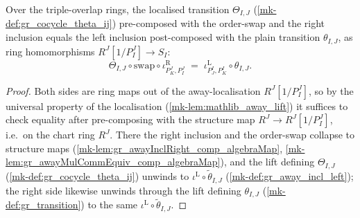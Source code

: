 \begin{lemma}\label{mk-lem:gr_chartTransition'_ringIdentity}
  \leanok

  Over the triple-overlap rings, the localised transition \(\Theta_{I,J}\)
  (\ref{mk-def:gr_cocycle_theta_ij}) pre-composed with the order-swap and the right
  inclusion equals the left inclusion post-composed with the plain transition
  \(\theta_{I,J}\), as ring homomorphisms \(R^J[1/P^J_I] \to S_I\):
  \[
    \Theta_{I,J} \circ \mathrm{swap} \circ \iota^{\mathrm{R}}_{P^J_K, P^J_I}
      \;=\; \iota^{\mathrm{L}}_{P^I_J, P^I_K} \circ \theta_{I,J} .
  \]
\end{lemma}
\begin{proof}
  \leanok
  Both sides are ring maps out of the away-localisation \(R^J[1/P^J_I]\), so by the
  universal property of the localisation (\ref{mk-lem:mathlib_away_lift}) it suffices
  to check equality after pre-composing with the structure map
  \(R^J \to R^J[1/P^J_I]\), i.e.\ on the chart ring \(R^J\). There the right
  inclusion and the order-swap collapse to structure maps
  (\ref{mk-lem:gr_awayInclRight_comp_algebraMap},
  \ref{mk-lem:gr_awayMulCommEquiv_comp_algebraMap}), and the lift defining
  \(\Theta_{I,J}\) (\ref{mk-def:gr_cocycle_theta_ij}) unwinds to
  \(\iota^{\mathrm{L}} \circ \tilde\theta_{I,J}\)
  (\ref{mk-def:gr_away_incl_left}); the right side likewise unwinds through the lift
  defining \(\theta_{I,J}\) (\ref{mk-def:gr_transition}) to the same
  \(\iota^{\mathrm{L}} \circ \tilde\theta_{I,J}\).
\end{proof}

